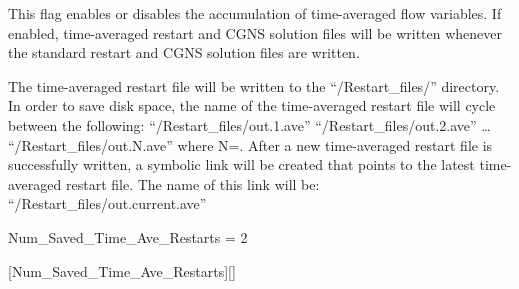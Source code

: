 \begin{nmldescbody}
This flag enables or disables the accumulation of time-averaged
flow variables.
%
If enabled, time-averaged restart and CGNS solution files will be
written whenever the standard restart and CGNS solution files are written.


% 


The time-averaged restart file will be written to the
  ``\slash{Restart\_files}\slash''
directory.
%
In order to save disk space, the name of the time-averaged restart file
will cycle between the following:
\newline\indent
``\slash{Restart\_files}\slash{out.1.ave}''
\newline\indent
``\slash{Restart\_files}\slash{out.2.ave}''
\newline\indent
\ldots
\newline\indent
``\slash{Restart\_files}\slash{out.N.ave}''
\newline
where N=.
%
After a new time-averaged restart file is successfully written,
a symbolic link will be created that points to the latest time-averaged restart
file. The name of this link will be:
\newline\indent
``\slash{Restart\_files}\slash{out.current.ave}'' 
\end{nmldescbody}


\begin{nmldescitem}
Num_Saved_Time_Ave_Restarts = 2
\end{nmldescitem}
[Num\_Saved\_Time\_Ave\_Restarts][]

